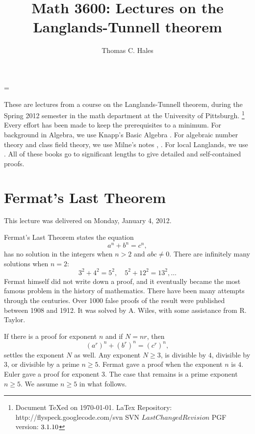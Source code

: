 \documentclass{amsart}
\def\svninfo{%
  \noindent
  Document TeXed on \today. \hfill\break
  LaTex Repository: http://flyspeck.googlecode.com/svn \hfill\break
  SVN $LastChangedRevision$\hfill\break
  PGF version: $\pgftypesetversion$
  }
\begin{document}
\title{Math 3600: Lectures on the Langlands-Tunnell theorem}
\author{Thomas C. Hales}
\maketitle


    \tableofcontents





\parindent=0pt
\parskip=\baselineskip
\def\seg{~~~}
\def\text{\hbox}

These are lectures from a course on the Langlands-Tunnell theorem, during
the Spring 2012 semester in the math department at the University of Pittsburgh.%
\footnote{\svninfo}
Every effort has been made to keep the prerequisites to a minimum.
For background in Algebra, we use Knapp's Basic Algebra \cite{knapp-basic}.
For algebraic number theory and class field theory, 
we use Milne's notes 
\cite{ANT}, \cite{CFT}.  For local Langlands, we use \cite{bushnell-henniart}.
All of these books go to significant lengths to give detailed and self-contained 
proofs.

\newpage
\section{Fermat's Last Theorem}

This lecture was delivered on Monday, January 4, 2012.

Fermat's Last Theorem \cite{DDT} states the equation
\[
a^n + b^n = c^n,
\]
has no solution in the integers when $n>2$ and $abc\ne 0$.  There are
infinitely many solutions when $n=2$:
\[
3^2 + 4^2 = 5^2,\quad 5^2 + 12^2 = 13^2, \ldots
\]
Fermat himself did not write down a proof, and it eventually became
the most famous problem in the history of mathematics.  There have
been many attempts through the centuries.  Over 1000 false proofs of
the result were published between 1908 and 1912.  It was solved by
A. Wiles, with some assistance from R. Taylor.

If there is a proof for exponent $n$ and if $N = n r$, then
\[
(a^r)^n + (b^r)^n = (c^r)^n,
\]
settles the exponent $N$ as well.  Any exponent $N\ge3$, is divisible
by $4$, divisible by $3$, or divisible by a prime $n\ge 5$.  Fermat
gave a proof when the exponent $n$ is $4$.  Euler gave a proof for
exponent $3$.  The case that remains is a prime exponent $n\ge 5$.  We
assume $n\ge5$ in what follows.
\end{document}

